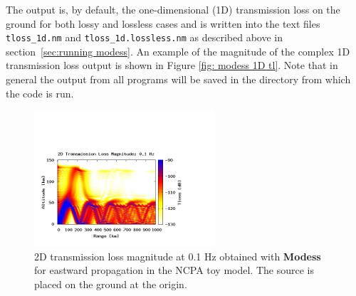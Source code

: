 The output is, by default, the one-dimensional (1D) transmission loss on the ground for both lossy and lossless cases and is written into the text files \verb+tloss_1d.nm+ and \verb+tloss_1d.lossless.nm+ as described above in section~\ref{sec:running modess}.  An example of the magnitude of the complex 1D transmission loss output is shown in Figure \ref{fig: modess 1D tl}. Note that in general the output from all programs will be saved in the directory from which the code is run.  
\begin{figure}
\begin{center}
\includegraphics[width=0.6\textwidth]{figs/modess_ex2.png}
\end{center}
\caption{2D transmission loss magnitude at 0.1 Hz obtained with {\bf Modess} for eastward propagation in the NCPA toy model. The source is placed on the ground at the origin.}
\label{fig: modess 2D tl}
\end{figure}

